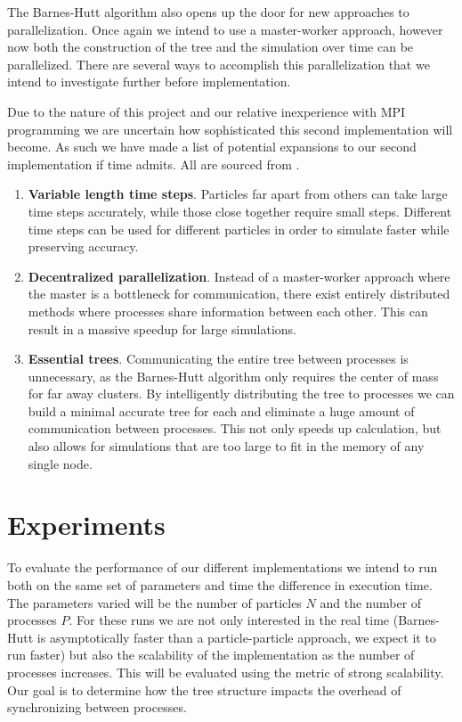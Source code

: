 \documentclass[11pt]{article}
\begin{document}
The Barnes-Hutt algorithm also opens up the door for new approaches to parallelization. Once again we intend to use a master-worker approach, however now both the construction of the tree and the simulation over time can be parallelized. There are several ways to accomplish this parallelization that we intend to investigate further before implementation.

Due to the nature of this project and our relative inexperience with MPI programming we are uncertain how sophisticated this second implementation will become. As such we have made a list of potential expansions to our second implementation if time admits. All are sourced from \cite{CM_190}.
\begin{enumerate}
    \item \textbf{Variable length time steps}. Particles far apart from others can take large time steps accurately, while those close together require small steps. Different time steps can be used for different particles in order to simulate faster while preserving accuracy.
    \item \textbf{Decentralized parallelization}. Instead of a master-worker approach where the master is a bottleneck for communication, there exist entirely distributed methods where processes share information between each other. This can result in a massive speedup for large simulations.
    \item \textbf{Essential trees}. Communicating the entire tree between processes is unnecessary, as the Barnes-Hutt algorithm only requires the center of mass for far away clusters. By intelligently distributing the tree to processes we can build a minimal accurate tree for each and eliminate a huge amount of communication between processes. This not only speeds up calculation, but also allows for simulations that are too large to fit in the memory of any single node. 
\end{enumerate}

\section {Experiments}\label{exper}
To evaluate the performance of our different implementations we intend to run both on the same set of parameters and time the difference in execution time. The parameters varied will be the number of particles $N$ and the number of processes $P$. For these runs we are not only interested in the real time (Barnes-Hutt is asymptotically faster than a particle-particle approach, we expect it to run faster) but also the scalability of the implementation as the number of processes increases. This will be evaluated using the metric of strong scalability. Our goal is to determine how the tree structure impacts the overhead of synchronizing between processes.
\end{document}
